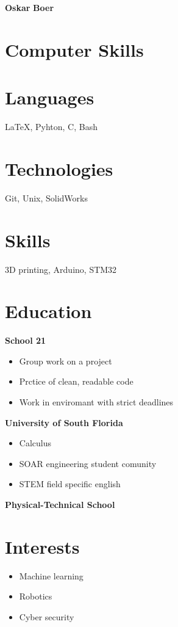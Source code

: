 \documentclass[12pt]{article}
\begin{document}
\begin{minipage}[t]{0.6\textwidth}
{\huge\textbf{\textcolor{myBrown}{Oskar}}} {\huge\textbf{\textcolor{myBrown}{Boer}}}\\
\section{\textcolor{myBrown}{Computer Skills}}
\section{\textcolor{myBrown}{Languages}}
\LaTeX, Pyhton, C, Bash
\section{\textcolor{myBrown}{Technologies}}
Git, Unix, SolidWorks
\section{\textcolor{myBrown}{Skills}}
3D printing, Arduino, STM32
%
\section{\textcolor{myBrown}{Education}}
\textbf{\textcolor{myBrown}{School 21}}
\begin{itemize}
\item Group work on a project
\item Prctice of clean, readable code
\item Work in enviromant with strict deadlines
\end{itemize}
\textbf{\textcolor{myBrown}{University of South Florida}}
\begin{itemize}
\item Calculus
\item SOAR engineering student comunity
\item STEM field specific english
\end{itemize}
\textbf{\textcolor{myBrown}{Physical-Technical School}}
%
\section{\textcolor{myBrown}{Interests}} 
\begin{itemize}
\item Machine learning
\item Robotics
\item Cyber security
\end{itemize}
\end{minipage}
%
\begin{minipage}{0.3\textwidth}
\end{minipage}
\end{document}
